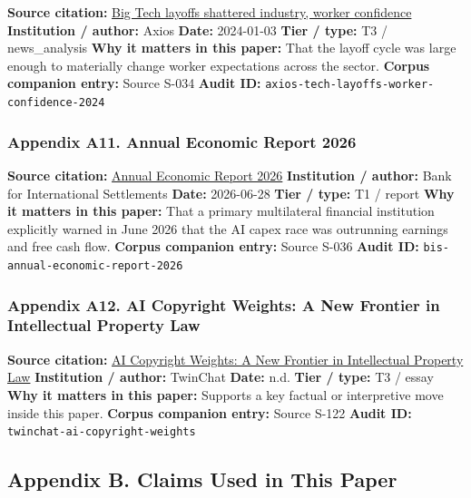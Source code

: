 \documentclass[
  american,
  11pt,
  letterpaper,
]{article}
\begin{document}
\textbf{Source citation:}
\href{https://www.axios.com/2024/01/03/tech-layoffs-google-microsoft-employees-impact-anxiety}{Big
Tech layoffs shattered industry, worker confidence} \textbf{Institution
/ author:} Axios \textbf{Date:} 2024-01-03 \textbf{Tier / type:} T3 /
news\_analysis \textbf{Why it matters in this paper:} That the layoff
cycle was large enough to materially change worker expectations across
the sector. \textbf{Corpus companion entry:} Source S-034 \textbf{Audit
ID:} \texttt{axios-tech-layoffs-worker-confidence-2024}

\subsubsection{Appendix A11. Annual Economic Report
2026}\label{ch-05-appendix-a11-annual-economic-report-2026}

\textbf{Source citation:}
\href{https://www.bis.org/publ/arpdf/ar2026e.pdf}{Annual Economic Report
2026} \textbf{Institution / author:} Bank for International Settlements
\textbf{Date:} 2026-06-28 \textbf{Tier / type:} T1 / report \textbf{Why
it matters in this paper:} That a primary multilateral financial
institution explicitly warned in June 2026 that the AI capex race was
outrunning earnings and free cash flow. \textbf{Corpus companion entry:}
Source S-036 \textbf{Audit ID:} \texttt{bis-annual-economic-report-2026}

\subsubsection{Appendix A12. AI Copyright Weights: A New Frontier in
Intellectual Property
Law}\label{ch-05-appendix-a12-ai-copyright-weights-a-new-frontier-in-intellectual-property-law}

\textbf{Source citation:}
\href{https://medium.com/twinchat/ai-copyright-weights-a-new-frontier-in-intellectual-property-law-d8ee1b6c55ee}{AI
Copyright Weights: A New Frontier in Intellectual Property Law}
\textbf{Institution / author:} TwinChat \textbf{Date:} n.d. \textbf{Tier
/ type:} T3 / essay \textbf{Why it matters in this paper:} Supports a
key factual or interpretive move inside this paper. \textbf{Corpus
companion entry:} Source S-122 \textbf{Audit ID:}
\texttt{twinchat-ai-copyright-weights}

\subsection{Appendix B. Claims Used in This
Paper}\label{appendix-b.-claims-used-in-this-paper-5}
\end{document}
